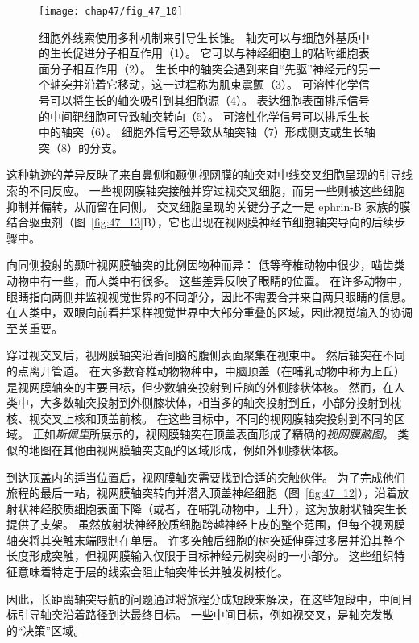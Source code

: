 \begin{figure}[htbp]
	\centering
	\texttt{[image: chap47/fig\_47\_10]}
	\caption{细胞外线索使用多种机制来引导生长锥。
		轴突可以与细胞外基质中的生长促进分子相互作用（1）。
		它可以与神经细胞上的粘附细胞表面分子相互作用（2）。
		生长中的轴突会遇到来自“先驱”神经元的另一个轴突并沿着它移动，这一过程称为肌束震颤（3）。
		可溶性化学信号可以将生长的轴突吸引到其细胞源（4）。
		表达细胞表面排斥信号的中间靶细胞可导致轴突转向（5）。
		可溶性化学信号可以排斥生长中的轴突（6）。
		细胞外信号还导致从轴突轴（7）形成侧支或生长轴突（8）的分支。}
	\label{fig:47_10}
\end{figure}


这种轨迹的差异反映了来自鼻侧和颞侧视网膜的轴突对中线交叉细胞呈现的引导线索的不同反应。
一些视网膜轴突接触并穿过视交叉细胞，而另一些则被这些细胞抑制并偏转，从而留在同侧。
交叉细胞呈现的关键分子之一是 ephrin-B 家族的膜结合驱虫剂（图~\ref{fig:47_13}B），它也出现在视网膜神经节细胞轴突导向的后续步骤中。


向同侧投射的颞叶视网膜轴突的比例因物种而异：
低等脊椎动物中很少，啮齿类动物中有一些，而人类中有很多。
这些差异反映了眼睛的位置。
在许多动物中，眼睛指向两侧并监视视觉世界的不同部分，因此不需要合并来自两只眼睛的信息。
在人类中，双眼向前看并采样视觉世界中大部分重叠的区域，因此视觉输入的协调至关重要。


穿过视交叉后，视网膜轴突沿着间脑的腹侧表面聚集在视束中。
然后轴突在不同的点离开管道。
在大多数脊椎动物物种中，中脑顶盖（在哺乳动物中称为上丘）是视网膜轴突的主要目标，但少数轴突投射到丘脑的外侧膝状体核。
然而，在人类中，大多数轴突投射到外侧膝状体，相当多的轴突投射到丘，小部分投射到枕核、视交叉上核和顶盖前核。
在这些目标中，不同的视网膜轴突投射到不同的区域。
正如\textit{斯佩里}所展示的，视网膜轴突在顶盖表面形成了精确的\textit{视网膜脑图}。
类似的地图在其他由视网膜轴突支配的区域形成，例如外侧膝状体核。


到达顶盖内的适当位置后，视网膜轴突需要找到合适的突触伙伴。
为了完成他们旅程的最后一站，视网膜轴突转向并潜入顶盖神经细胞（图~\ref{fig:47_12}），沿着放射状神经胶质细胞表面下降（或者，在哺乳动物中，上升），这为放射状轴突生长提供了支架。
虽然放射状神经胶质细胞跨越神经上皮的整个范围，但每个视网膜轴突将其突触末端限制在单层。
许多突触后细胞的树突延伸穿过多层并沿其整个长度形成突触，但视网膜输入仅限于目标神经元树突树的一小部分。
这些组织特征意味着特定于层的线索会阻止轴突伸长并触发树枝化。


因此，长距离轴突导航的问题通过将旅程分成短段来解决，在这些短段中，中间目标引导轴突沿着路径到达最终目标。
一些中间目标，例如视交叉，是轴突发散的“决策”区域。


